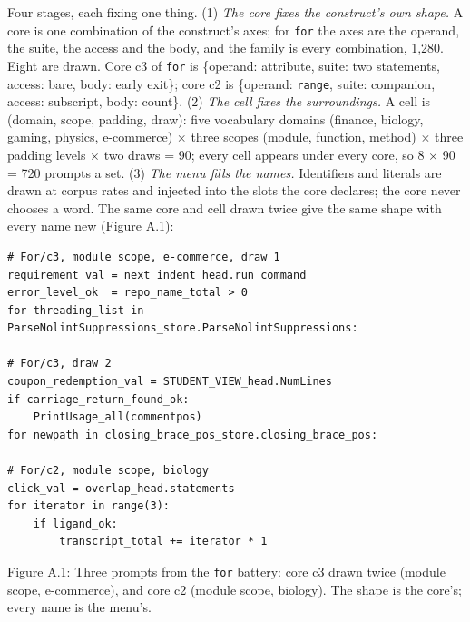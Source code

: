 \documentclass{article}
\begin{document}
Four stages, each fixing one thing. (1) \emph{The core fixes the construct's own shape.} A core is one combination of the construct's axes; for \texttt{for} the axes are the operand, the suite, the access and the body, and the family is every combination, 1,280. Eight are drawn. Core c3 of \texttt{for} is \{operand: attribute, suite: two statements, access: bare, body: early exit\}; core c2 is \{operand: \texttt{range}, suite: companion, access: subscript, body: count\}. (2) \emph{The cell fixes the surroundings.} A cell is (domain, scope, padding, draw): five vocabulary domains (finance, biology, gaming, physics, e-commerce) $\times$ three scopes (module, function, method) $\times$ three padding levels $\times$ two draws = 90; every cell appears under every core, so 8 $\times$ 90 = 720 prompts a set. (3) \emph{The menu fills the names.} Identifiers and literals are drawn at corpus rates and injected into the slots the core declares; the core never chooses a word. The same core and cell drawn twice give the same shape with every name new (Figure A.1):


\begin{lrbox}{\codebox}
\begin{varwidth}{\maxdimen}
\begin{verbatim}
# For/c3, module scope, e-commerce, draw 1
requirement_val = next_indent_head.run_command
error_level_ok  = repo_name_total > 0
for threading_list in ParseNolintSuppressions_store.ParseNolintSuppressions:

# For/c3, draw 2
coupon_redemption_val = STUDENT_VIEW_head.NumLines
if carriage_return_found_ok:
    PrintUsage_all(commentpos)
for newpath in closing_brace_pos_store.closing_brace_pos:

# For/c2, module scope, biology
click_val = overlap_head.statements
for iterator in range(3):
    if ligand_ok:
        transcript_total += iterator * 1
\end{verbatim}
\end{varwidth}
\end{lrbox}
\par\noindent\hspace*{0.06\columnwidth}\resizebox{0.8\columnwidth}{!}{\usebox{\codebox}}\par


\vspace{4pt}
\noindent Figure A.1: Three prompts from the \texttt{for} battery: core c3 drawn twice (module scope, e-commerce), and core c2 (module scope, biology). The shape is the core's; every name is the menu's.
\vspace{12pt}
\end{document}
